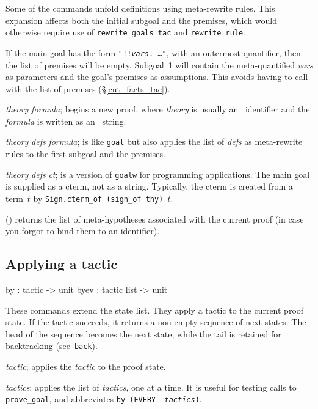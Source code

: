 Some of the commands unfold definitions using meta-rewrite rules.  This
expansion affects both the initial subgoal and the premises, which would
otherwise require use of {\tt rewrite_goals_tac} and
{\tt rewrite_rule}.

If the main goal has the form {\tt"!!{\it vars}.\ \ldots"}, with an
outermost quantifier, then the list of premises will be empty.  Subgoal~1
will contain the meta-quantified {\it vars\/} as parameters and the goal's
premises as assumptions.  This avoids having to call
 with the list of premises (\S\ref{cut_facts_tac}).

\begin{ttdescription}
\item[\ttindexbold{goal} {\it theory} {\it formula};] 
begins a new proof, where {\it theory} is usually an \ML\ identifier
and the {\it formula\/} is written as an \ML\ string.

\item[\ttindexbold{goalw} {\it theory} {\it defs} {\it formula};] 
is like {\tt goal} but also applies the list of {\it defs\/} as
meta-rewrite rules to the first subgoal and the premises.

\item[\ttindexbold{goalw_cterm} {\it theory} {\it defs} {\it ct};] 
is a version of {\tt goalw} for programming applications.  The main goal is
supplied as a cterm, not as a string.  Typically, the cterm is created from
a term~$t$ by \hbox{\tt Sign.cterm_of (sign_of thy) $t$}.

\item[\ttindexbold{premises}()] 
returns the list of meta-hypotheses associated with the current proof (in
case you forgot to bind them to an \ML{} identifier).
\end{ttdescription}


\subsection{Applying a tactic}
\begin{ttbox} 
by   : tactic -> unit
byev : tactic list -> unit
\end{ttbox}
These commands extend the state list.  They apply a tactic to the current
proof state.  If the tactic succeeds, it returns a non-empty sequence of
next states.  The head of the sequence becomes the next state, while the
tail is retained for backtracking (see~{\tt back}).
\begin{ttdescription} \item[\ttindexbold{by} {\it tactic};] 
applies the {\it tactic\/} to the proof state.

\item[\ttindexbold{byev} {\it tactics};] 
applies the list of {\it tactics}, one at a time.  It is useful for testing
calls to {\tt prove_goal}, and abbreviates \hbox{\tt by (EVERY {\it
tactics})}.
\end{ttdescription}


